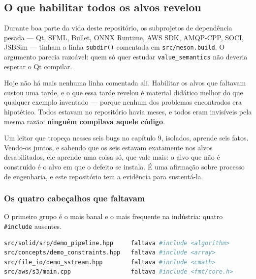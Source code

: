 \subsection{O que habilitar todos os alvos revelou}
\label{sec:habilitar-tudo}

Durante boa parte da vida deste repositório, os subprojetos de dependência
pesada --- Qt, SFML, Bullet, ONNX Runtime, AWS SDK, AMQP-CPP, SOCI, JSBSim ---
tinham a linha \texttt{subdir()} comentada em \texttt{src/meson.build}. O
argumento parecia razoável: quem só quer estudar \texttt{value\_semantics} não
deveria esperar o Qt compilar.

Hoje não há mais nenhuma linha comentada ali. Habilitar os alvos que faltavam
custou uma tarde, e o que essa tarde revelou é material didático melhor do que
qualquer exemplo inventado --- porque nenhum dos problemas encontrados era
hipotético. Todos estavam no repositório havia meses, e todos eram invisíveis
pela mesma razão: \textbf{ninguém compilava aquele código}.

\begin{porque}
Um leitor que tropeça nesses seis bugs no capítulo 9, isolados, aprende seis
fatos. Vendo-os juntos, e sabendo que os seis estavam exatamente nos alvos
desabilitados, ele aprende uma coisa só, que vale mais: o alvo que não é
construído é o alvo em que o defeito se instala. É uma afirmação sobre
processo de engenharia, e este repositório tem a evidência para sustentá-la.
\end{porque}

\subsubsection{Os quatro cabeçalhos que faltavam}

O primeiro grupo é o mais banal e o mais frequente na indústria: quatro
\texttt{\#include} ausentes.

\begin{lstlisting}[style=bt, language=bash,
    caption={Os quatro cabeçalhos que faltavam, todos em alvos que não eram
             construídos. Fonte: o comentário no topo do índice de
             subprojetos, em \texttt{src/}.}]
src/solid/srp/demo_pipeline.hpp     faltava #include <algorithm>
src/concepts/demo_constraints.hpp   faltava #include <array>
src/file_io/demo_sstream.hpp        faltava #include <cmath>
src/aws/s3/main.cpp                 faltava #include <fmt/core.h>
\end{lstlisting}

